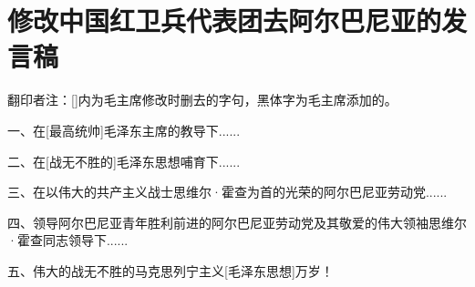 \section[修改中国红卫兵代表团去阿尔巴尼亚的发言稿（一九六七年六月）]{修改中国红卫兵代表团去阿尔巴尼亚的发言稿}


翻印者注：[]内为毛主席修改时删去的字句，黑体字为毛主席添加的。

一、在[最高统帅]毛泽东主席的教导下......

二、在[战无不胜的]毛泽东思想哺育下......

三、在以伟大的共产主义战士思维尔·霍查为首的光荣的阿尔巴尼亚劳动党......

四、领导阿尔巴尼亚青年胜利前进的阿尔巴尼亚劳动党及其敬爱的伟大领袖思维尔·霍查同志领导下......

五、伟大的战无不胜的马克思列宁主义[毛泽东思想]万岁！



